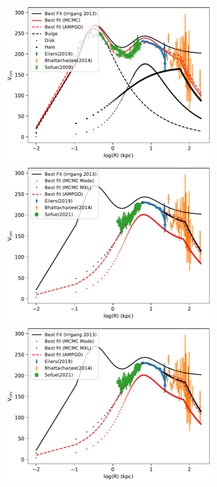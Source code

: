 \documentclass[fleqn,usenatbib]{mnras}
\begin{document}
\begin{figure}
\includegraphics[width=\columnwidth]{Model_I/Plots/Sofue(2009)/Rotcur_ModelI_eil_bhatta_log_10000_100.pdf}
\includegraphics[width=\columnwidth]{Model_I/Plots/Sofue(2021)/Rotcur_ModelI_eil_bhatta_log_10000_100.pdf}
\includegraphics[width=\columnwidth]{Model_I/Plots/Sofue(2021)/Rotcur_ModelI_eil_bhatta_log_10000_100.pdf}

\end{figure}
\end{document}
